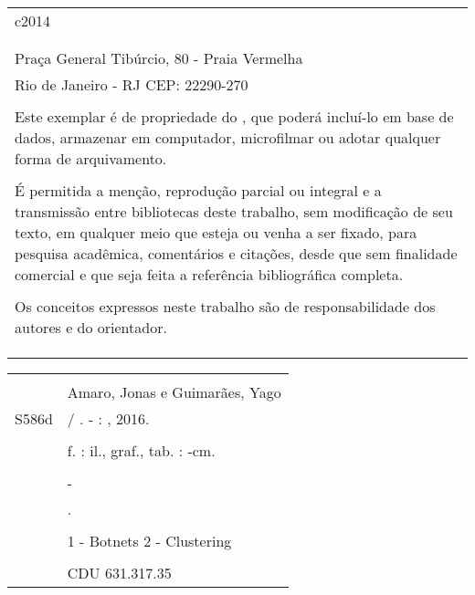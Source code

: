 \begin{fichacatalografica}
	\begin{tabular}{@{\hspace{0cm}}p{14.8cm}}
	c2014\\
	\\
	\imprimirinstituicao\\
	Praça General Tibúrcio, 80 - Praia Vermelha\\
	Rio de Janeiro - RJ \hspace{1.5cm} CEP: 22290-270\\
	\\
	Este exemplar é de propriedade do \imprimirinstituicao, que poderá incluí-lo em base de dados, armazenar em computador, microfilmar ou adotar qualquer forma de arquivamento.\\
	\\
	É permitida a menção, reprodução parcial ou integral e a transmissão entre bibliotecas deste trabalho, sem modificação de seu texto, em qualquer meio que esteja ou venha a ser fixado, para pesquisa acadêmica, comentários e citações, desde que sem finalidade comercial e que seja feita a referência bibliográfica completa.\\
	\\
	Os conceitos expressos neste trabalho são de responsabilidade dos autores e do orientador.\\
	\\
	\\
	\\
	\end{tabular}

	\small
	\begin{center}
	\begin{tabular}{|cp{13cm}|} \hline
		\hspace{1.3cm} & \\
		& Amaro, Jonas e Guimarães, Yago \\
		\hspace{0.2cm} S586d & \hspace{0.3cm} \imprimirtitulo{} / \imprimirautor. - \imprimirlocal: \imprimirinstituicao, 2016. \\
		& \\
		& \hspace{0.65cm} \pageref{Lastpage}f. : il., graf., tab. : -cm. \\
		& \\
		& \hspace{0.6cm} \imprimirtipotrabalho{} - \imprimirinstituicao \\
		& \hspace{0.6cm} \imprimirorientadorRotulo{} \imprimirorientador.\\
		& \\
		& \hspace{0.6cm} 1 - Botnets \hspace{0.1cm} 2 - Clustering\\
		
		& \\ 
		& \hspace{9.75cm} CDU 631.317.35 \\
		\hline
	\end{tabular}
	\end{center}
\end{fichacatalografica}